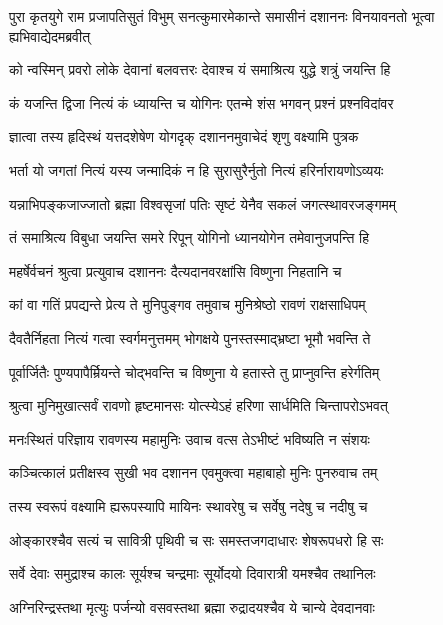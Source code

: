 \threelineshloka
{पुरा कृतयुगे राम प्रजापतिसुतं विभुम्}
{सनत्कुमारमेकान्ते समासीनं दशाननः}
{विनयावनतो भूत्वा ह्यभिवाद्येदमब्रवीत्} %

\twolineshloka
{को न्वस्मिन् प्रवरो लोके देवानां बलवत्तरः}
{देवाश्च यं समाश्रित्य युद्धे शत्रुं जयन्ति हि} %

\twolineshloka
{कं यजन्ति द्विजा नित्यं कं ध्यायन्ति च योगिनः}
{एतन्मे शंस भगवन् प्रश्नं प्रश्नविदांवर} %

\twolineshloka
{ज्ञात्वा तस्य हृदिस्थं यत्तदशेषेण योगदृक्}
{दशाननमुवाचेदं शृणु वक्ष्यामि पुत्रक} %

\twolineshloka
{भर्ता यो जगतां नित्यं यस्य जन्मादिकं न हि}
{सुरासुरैर्नुतो नित्यं हरिर्नारायणोऽव्ययः} %

\twolineshloka
{यन्नाभिपङ्कजाज्जातो ब्रह्मा विश्वसृजां पतिः}
{सृष्टं येनैव सकलं जगत्स्थावरजङ्गमम्} %

\twolineshloka
{तं समाश्रित्य विबुधा जयन्ति समरे रिपून्}
{योगिनो ध्यानयोगेन तमेवानुजपन्ति हि} %

\twolineshloka
{महर्षेर्वचनं श्रुत्वा प्रत्युवाच दशाननः}
{दैत्यदानवरक्षांसि विष्णुना निहतानि च} %

\twolineshloka
{कां वा गतिं प्रपद्यन्ते प्रेत्य ते मुनिपुङ्गव}
{तमुवाच मुनिश्रेष्ठो रावणं राक्षसाधिपम्} %

\twolineshloka
{दैवतैर्निहता नित्यं गत्वा स्वर्गमनुत्तमम्}
{भोगक्षये पुनस्तस्माद्भ्रष्टा भूमौ भवन्ति ते} %

\twolineshloka
{पूर्वार्जितैः पुण्यपापैर्म्रियन्ते चोद्भवन्ति च}
{विष्णुना ये हतास्ते तु प्राप्नुवन्ति हरेर्गतिम्} %

\twolineshloka
{श्रुत्वा मुनिमुखात्सर्वं रावणो हृष्टमानसः}
{योत्स्येऽहं हरिणा सार्धमिति चिन्तापरोऽभवत्} %

\twolineshloka
{मनःस्थितं परिज्ञाय रावणस्य महामुनिः}
{उवाच वत्स तेऽभीष्टं भविष्यति न संशयः} %

\twolineshloka
{कञ्चित्कालं प्रतीक्षस्व सुखी भव दशानन}
{एवमुक्त्वा महाबाहो मुनिः पुनरुवाच तम्} %

\twolineshloka
{तस्य स्वरूपं वक्ष्यामि ह्यरूपस्यापि मायिनः}
{स्थावरेषु च सर्वेषु नदेषु च नदीषु च} %

\twolineshloka
{ओङ्कारश्चैव सत्यं च सावित्री पृथिवी च सः}
{समस्तजगदाधारः शेषरूपधरो हि सः} %

\twolineshloka
{सर्वे देवाः समुद्राश्च कालः सूर्यश्च चन्द्रमाः}
{सूर्योदयो दिवारात्री यमश्चैव तथानिलः} %

\twolineshloka
{अग्निरिन्द्रस्तथा मृत्युः पर्जन्यो वसवस्तथा}
{ब्रह्मा रुद्रादयश्चैव ये चान्ये देवदानवाः} %

